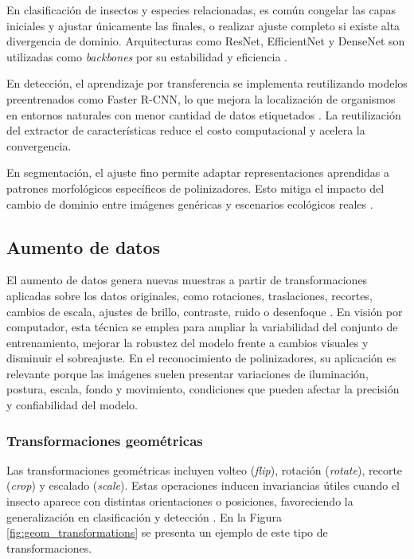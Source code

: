 \vspace{-1.0 cm}
En clasificación de insectos y especies relacionadas, es común congelar las capas iniciales y ajustar únicamente las finales, o realizar ajuste completo si existe alta divergencia de dominio. Arquitecturas como ResNet, EfficientNet y DenseNet son utilizadas como \textit{backbones} por su estabilidad y eficiencia \parencite{Yang2020,Jian2023,sajib2025comparative}.

En detección, el aprendizaje por transferencia se implementa reutilizando modelos preentrenados como Faster R-CNN, lo que mejora la localización de organismos en entornos naturales con menor cantidad de datos etiquetados \parencite{Tseng2022}. La reutilización del extractor de características reduce el costo computacional y acelera la convergencia.

En segmentación, el ajuste fino permite adaptar representaciones aprendidas a patrones morfológicos específicos de polinizadores. Esto mitiga el impacto del cambio de dominio entre imágenes genéricas y escenarios ecológicos reales \parencite{Hassanie2025,Zheng2021}.

\subsection{Aumento de datos}

El aumento de datos genera nuevas muestras a partir de transformaciones aplicadas sobre los datos originales, como rotaciones, traslaciones, recortes, cambios de escala, ajustes de brillo, contraste, ruido o desenfoque \parencite{liu2024augmentation}. En visión por computador, esta técnica se emplea para ampliar la variabilidad del conjunto de entrenamiento, mejorar la robustez del modelo frente a cambios visuales y disminuir el sobreajuste. En el reconocimiento de polinizadores, su aplicación es relevante porque las imágenes suelen presentar variaciones de iluminación, postura, escala, fondo y movimiento, condiciones que pueden afectar la precisión y confiabilidad del modelo.

\subsubsection{Transformaciones geométricas}

Las transformaciones geométricas incluyen volteo (\textit{flip}), rotación (\textit{rotate}), recorte (\textit{crop}) y escalado (\textit{scale}). Estas operaciones inducen invariancias útiles cuando el insecto aparece con distintas orientaciones o posiciones, favoreciendo la generalización en clasificación y detección \parencite{Kaur2022,Wu2024,Madaan2024}. En la Figura \ref{fig:geom_transformations} se presenta un ejemplo de este tipo de transformaciones. 


